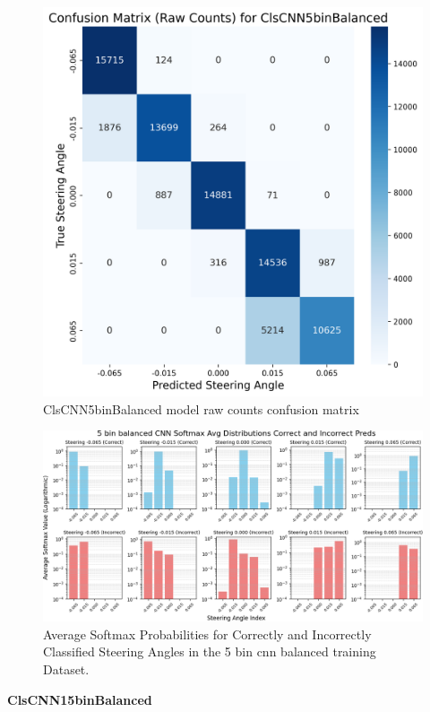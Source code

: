 \begin{figure}[H]
\centering
\includegraphics[width=0.65\linewidth]{Figures/Results/cm_raw_ClsCNN5binBalanced.png}
\caption{ClsCNN5binBalanced model raw counts confusion matrix}
\label{fig:cm_raw_ClsCNN5binBalanced}
\end{figure}

\begin{figure}[H]
    \centering
    \includegraphics[width=1\linewidth]{Figures/Results/5_bins_cnn_softmax_dist_plot_balanced.png}
    \caption{Average Softmax Probabilities for Correctly and Incorrectly Classified Steering Angles in the 5 bin cnn balanced training Dataset.}
    \label{fig:5_bins_cnn_softmax_dist_balanced}
\end{figure}


\textbf{ClsCNN15binBalanced}

